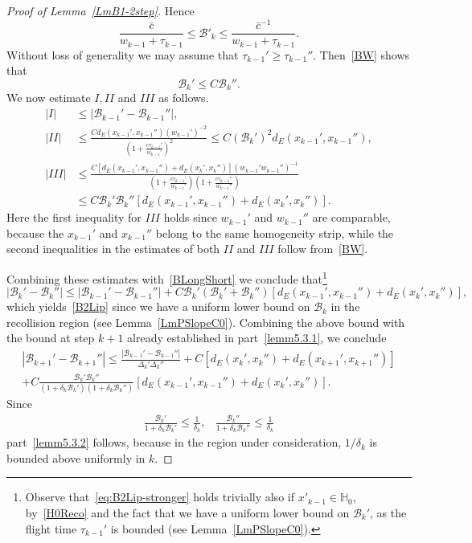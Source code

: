 \documentclass[AHL, Unicode, longabstracts,published]{cedram}
\newcommand{\inv}{^{-1}}
\newcommand{\homo}{\mathbb{H}}
\newcommand{\cB}{\mathcal{B}}
\newcommand{\pslope}{\mathcal{B}}
\newcommand{\ppPrivate}[2]{#1^{#2}}
\newcommand{\prePrivate}[1]{\ppPrivate{#1}{-}}
\newcommand{\prpslope}{\prePrivate{\pslope}}
\newcommand*\brc{{\bar{c}}}
\newcommand*\RmIII{{{I\!\!I\!\!I}}}
\newcommand*\RmII{{{I\!\!I}}}
\renewcommand{\prpslope}{\cB}
\renewcommand{\prpslope}{\cB}
\renewcommand{\prpslope}{\cB}
\begin{document}
\begin{proof}[Proof of Lemma~\ref{LmB1-2step}]
Hence
\begin{equation}\label{BW}
\frac{\brc}{w_{k-1}+\tau_{k-1}}\leq \cB'_k\leq \frac{\brc^{-1}}{w_{k-1}+\tau_{k-1}}.
\end{equation}
Without loss of generality we may assume that $\tau_{k-1}'\geq \tau_{k-1}''$. Then~\eqref{BW} shows that
\begin{equation}\label{BLongShort}
\cB_k'\leq C \cB_k''.
\end{equation}
We now estimate $I, \RmII$ and $\RmIII$ as follows.
\begin{align*}
|I| &\leq |\cB_{k-1}'-\cB_{k-1}''|,\\
|\RmII|&\leq \frac{C d_E(x_{k-1}', x_{k-1}'') (w_{k-1}')^{-2}}{\left(1+\frac{c \tau_{k-1}'}{w_{k-1}'}\right)^2}
\leq C (\cB_k')^2 d_E(x_{k-1}', x_{k-1}''),\\
|\RmIII|&\leq \frac{C \left[d_E(x_{k-1}', x_{k-1}'')+d_E(x_{k}', x_{k}'')\right] (w_{k-1}' w_{k-1}'')\inv} {\left(1+\frac{c \tau_{k-1}'}{w_{k-1}'}\right)\left(1+\frac{c \tau_{k-1}''}{w_{k-1}''}\right)}\\
&\leq C \cB_k' \cB_k'' \left[d_E(x_{k-1}', x_{k-1}'')+d_E(x_{k}', x_{k}'')\right].
\end{align*}
Here the first inequality for $\RmIII$ holds since $w_{k-1}'$ and $w_{k-1}''$ are comparable, because the $x_{k-1}'$ and $x_{k-1}''$ belong to the same homogeneity strip, while the second inequalities in the estimates of both $\RmII$ and $\RmIII$ follow from~\eqref{BW}.

Combining these estimates with~\eqref{BLongShort} we conclude that\footnote{ Observe that~\eqref{eq:B2Lip-stronger} holds trivially also if $x'_{k-1}\in\homo_{0}$, by~\eqref{H0Reco} and the fact that we have a uniform lower bound on $\cB_k'$, as the flight time $\tau_{k-1}'$ is bounded (see Lemma~\ref{LmPSlopeC0}).}
\begin{equation}\label{eq:B2Lip-stronger}
|\cB_k'-\cB_k''|
\leq
|\cB_{k-1}'-\cB_{k-1}''|+
C \cB_k' (\cB_k'+\cB_k'') \left[d_E(x_{k-1}', x_{k-1}'')+d_E(x_{k}', x_{k}'')\right],
\end{equation}
which yields~\eqref{B2Lip} since we have a uniform lower bound on $\prpslope_k$ in the recollision region (see Lemma~\ref{LmPSlopeC0}). Combining the above bound with the bound at step $k+1$ already established in part~\eqref{lemm5.3.1}, we conclude
\begin{multline*}
|\cB_{k+1}'-\cB_{k+1}''|\leq\frac{|\cB_{k-1}'-\cB_{k-1}''|}{\Delta_{k}'\Delta_{k}''} +C\left[d_E(x_{k}', x_{k}'')+d_E(x_{k+1}', x_{k+1}'')\right] \\
+ C \frac{\cB_k' \cB_k''}{(1+\delta_k\cB_k')(1+\delta_k\cB_k'')}
\left[d_E(x_{k-1}', x_{k-1}'')+d_E(x_{k}', x_{k}'')\right].
\end{multline*}
Since
\begin{align*}
\frac{\cB_k'}{1+\delta_k \cB_k'}\leq \frac{1}{\delta_k}, &\frac{\cB_k''}{1+\delta_k \cB_k''}\leq \frac{1}{\delta_k}
\end{align*}
part~\eqref{lemm5.3.2} follows, because in the region under consideration, $1/\delta_k$ is bounded above uniformly in $k$.
\end{proof}
\end{document}
